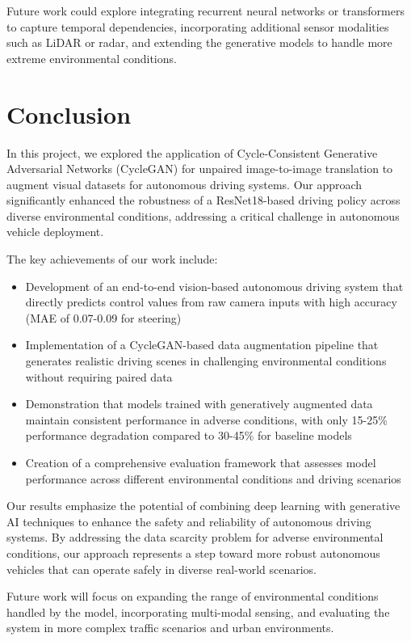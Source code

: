 \documentclass[pdflatex,sn-mathphys-num]{sn-jnl}%
\theoremstyle{thmstyleone}%
\theoremstyle{thmstyletwo}%
\theoremstyle{thmstylethree}%
\begin{document}
Future work could explore integrating recurrent neural networks or transformers to capture temporal dependencies, incorporating additional sensor modalities such as LiDAR or radar, and extending the generative models to handle more extreme environmental conditions.

\section{Conclusion}\label{sec13}

In this project, we explored the application of Cycle-Consistent Generative Adversarial Networks (CycleGAN) for unpaired image-to-image translation to augment visual datasets for autonomous driving systems. Our approach significantly enhanced the robustness of a ResNet18-based driving policy across diverse environmental conditions, addressing a critical challenge in autonomous vehicle deployment.

The key achievements of our work include:

\begin{itemize}
\item Development of an end-to-end vision-based autonomous driving system that directly predicts control values from raw camera inputs with high accuracy (MAE of 0.07-0.09 for steering)
\item Implementation of a CycleGAN-based data augmentation pipeline that generates realistic driving scenes in challenging environmental conditions without requiring paired data
\item Demonstration that models trained with generatively augmented data maintain consistent performance in adverse conditions, with only 15-25\% performance degradation compared to 30-45\% for baseline models
\item Creation of a comprehensive evaluation framework that assesses model performance across different environmental conditions and driving scenarios
\end{itemize}

Our results emphasize the potential of combining deep learning with generative AI techniques to enhance the safety and reliability of autonomous driving systems. By addressing the data scarcity problem for adverse environmental conditions, our approach represents a step toward more robust autonomous vehicles that can operate safely in diverse real-world scenarios.

Future work will focus on expanding the range of environmental conditions handled by the model, incorporating multi-modal sensing, and evaluating the system in more complex traffic scenarios and urban environments.
\end{document}
